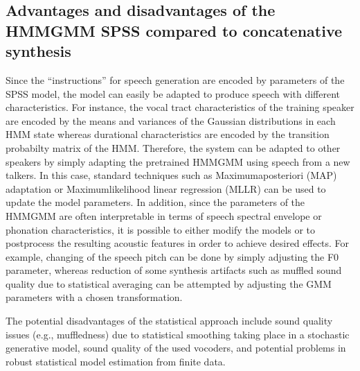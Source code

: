 \documentclass[letterpaper,10pt,english]{jupyterBook}
\begin{document}
\subsection{Advantages and disadvantages of the HMM\sphinxhyphen{}GMM SPSS compared to concatenative synthesis}
\label{\detokenize{Synthesis/Statistical_parametric_speech_synthesis:advantages-and-disadvantages-of-the-hmm-gmm-spss-compared-to-concatenative-synthesis}}
\sphinxAtStartPar
Since the “instructions” for speech generation are encoded by parameters
of the SPSS model, the model can easily be adapted to produce speech
with different characteristics. For instance, the vocal tract
characteristics of the training speaker are encoded by the means and
variances of the Gaussian distributions in each HMM state whereas
durational characteristics are encoded by the transition probabilty
matrix of the HMM. Therefore, the system can be adapted to other
speakers by simply adapting the pre\sphinxhyphen{}trained HMM\sphinxhyphen{}GMM using speech from a
new talkers. In this case, standard techniques such as
Maximum\sphinxhyphen{}a\sphinxhyphen{}posteriori (MAP) adaptation or Maximum\sphinxhyphen{}likelihood linear
regression (MLLR) can be used to update the model parameters. In
addition, since the parameters of the HMM\sphinxhyphen{}GMM are often interpretable in
terms of speech spectral envelope or phonation characteristics, it is
possible to either modify the models or to post\sphinxhyphen{}process the resulting
acoustic features in order to achieve desired effects. For example,
changing of the speech pitch can be done by simply adjusting the F0
parameter, whereas reduction of some synthesis artifacts such as muffled
sound quality due to statistical averaging can be attempted by adjusting
the GMM parameters with a chosen transformation.

\sphinxAtStartPar
The potential disadvantages of the statistical approach include sound
quality issues (e.g., muffledness) due to statistical smoothing taking
place in a stochastic generative model, sound quality of the used
vocoders, and potential problems in robust statistical model estimation
from finite data.
\end{document}
